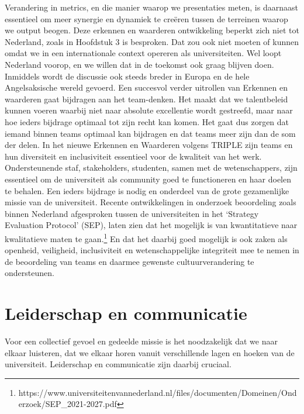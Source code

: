 \documentclass[empirical, authordate, ]{new-jote-article}
\begin{document}
	Verandering in metrics, en die manier waarop we presentaties meten, is daarnaast essentieel om meer synergie en dynamiek te creëren tussen de terreinen waarop we output beogen. Deze erkennen en waarderen ontwikkeling beperkt zich niet tot Nederland, zoals in Hoofdstuk 3 is besproken. Dat zou ook niet moeten of kunnen omdat we in een internationale context opereren als universiteiten. Wel loopt Nederland voorop, en we willen dat in de toekomst ook graag blijven doen. Inmiddels wordt de discussie ook steeds breder in Europa en de hele Angelsaksische wereld gevoerd. Een succesvol verder uitrollen van Erkennen en waarderen gaat bijdragen aan het team-denken. Het maakt dat we talentbeleid kunnen voeren waarbij niet naar absolute excellentie wordt gestreefd, maar naar hoe ieders bijdrage optimaal tot zijn recht kan komen. Het gaat dus zorgen dat iemand binnen teams optimaal kan bijdragen en dat teams meer zijn dan de som der delen. In het nieuwe Erkennen en Waarderen volgens TRIPLE zijn teams en hun diversiteit en inclusiviteit essentieel voor de kwaliteit van het werk. Ondersteunende staf, stakeholders, studenten, samen met de wetenschappers, zijn essentieel om de universiteit als community goed te functioneren en haar doelen te behalen. Een ieders bijdrage is nodig en onderdeel van de grote gezamenlijke missie van de universiteit. Recente ontwikkelingen in onderzoek beoordeling zoals binnen Nederland afgesproken tussen de universiteiten in het ‘Strategy Evaluation Protocol' (SEP), laten zien dat het mogelijk is van kwantitatieve naar kwalitatieve maten te gaan.\footnote{https://www.universiteitenvannederland.nl/files/documenten/Domeinen/Onderzoek/SEP\_2021-2027.pdf} En dat het daarbij goed mogelijk is ook zaken als openheid, veiligheid, inclusiviteit en wetenschappelijke integriteit mee te nemen in de beoordeling van teams en daarmee gewenste cultuurverandering te ondersteunen.



	\section{Leiderschap en communicatie}



	Voor een collectief gevoel en gedeelde missie is het noodzakelijk dat we naar elkaar luisteren, dat we elkaar horen vanuit verschillende lagen en hoeken van de universiteit. Leiderschap en communicatie zijn daarbij cruciaal.
\end{document}
